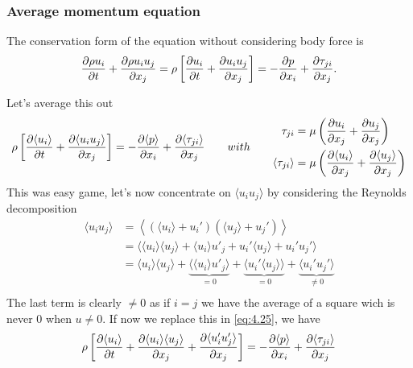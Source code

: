 	\subsubsection{Average momentum equation}
		The conservation form of the equation without considering body force is
		\begin{equation}
			 \frac{\partial \rho u_i}{\partial t} + \frac{\partial \rho u_i u_j}{\partial x_j} = \rho \left[ \frac{\partial u_i}{\partial t} + \frac{\partial u_iu_j}{\partial x_j} \right] = - \frac{\partial p}{\partial x_i} + \frac{\partial \tau _{ji}}{\partial x_j}.
		\end{equation}
		
		Let's average this out 
		\begin{equation}
			\rho \left[ \frac{\partial \langle u_i\rangle}{\partial t} + \frac{\partial \langle u_iu_j\rangle}{\partial x_j} \right] = - \frac{\partial \langle p\rangle}{\partial x_i} + \frac{\partial \langle \tau _{ji}\rangle}{\partial x_j} \qquad with \qquad 
			\begin{aligned}
				\tau _{ji} &= \mu \left( \frac{\partial u_i}{\partial x_j} + \frac{\partial u_j}{\partial x_j}\right) \\
			\langle \tau _{ji} \rangle &= \mu \left( \frac{\partial \langle u_i \rangle}{\partial x_j} + \frac{\partial \langle u_j \rangle}{\partial x_j}\right)	
			\end{aligned}
			\label{eq:4.25}
		\end{equation}
		This was easy game, let's now concentrate on $\langle u_i u_j \rangle$ by considering the Reynolds decomposition
		\begin{equation}
		\begin{aligned}
			\langle u_i u_j\rangle &= \left\langle (\langle u_i \rangle + u_i') (\langle u_j \rangle + u_j' )  \right\rangle \\
 &= \langle  \langle u_i \rangle \langle u_j \rangle + \langle u_i \rangle u'_j + u_i' \langle u_j \rangle + u_i' u_j'\rangle\\ 
&= \langle u_i\rangle \langle u_j \rangle + \underbrace{\langle \langle u_i \rangle u'_j \rangle}_{=0} +\underbrace{\langle  u_i' \langle u_j \rangle \rangle }_{=0} + \underbrace{\langle u_i' u_j'\rangle}_{\neq 0} \\
		\end{aligned}
		\end{equation}
		The last term is clearly $\neq 0$ as if $i=j$ we have the average of a square wich is never 0 when $u\neq 0$. If now we replace this in \eqref{eq:4.25}, we have
		\begin{equation}
			\rho \left[ \frac{\partial \langle u_i\rangle}{\partial t} + \frac{\partial \langle u_i\rangle \langle u_j\rangle}{\partial x_j} + \frac{\partial \langle u_i' u_j' \rangle}{\partial x_j} \right] = - \frac{\partial \langle p\rangle}{\partial x_i} + \frac{\partial \langle \tau _{ji}\rangle}{\partial x_j}
		\end{equation}
